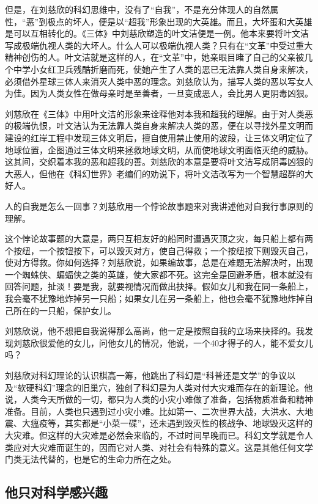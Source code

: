 \documentclass[fontset=fandol,12pt,a5paper]{ctexbook}
\begin{document}
但是，在刘慈欣的科幻思维中，没有了“自我”，不是充分体现人的自然属性，“恶”到极点的坏人，便是以“超我”形象出现的大英雄。而且，大坏蛋和大英雄是可以互相转化的。《三体》中刘慈欣塑造的叶文洁便是一例。他本来要将叶文洁写成极端仇视人类的大坏人。什么人可以极端仇视人类？只有在“文革”中受过重大精神创伤的人。叶文洁就是这样的人，在“文革”中，她亲眼目睹了自己的父亲被几个中学小女红卫兵残酷折磨而死，使她产生了人类的恶已无法靠人类自身来解决，必须借外星球三体人来消灭人类中恶的理念。刘慈欣认为，描写人类的恶以写女人为佳。因为人类女性在做母亲时是至善者，一旦变成恶人，会比男人更阴毒凶狠。

刘慈欣在《三体》中用叶文洁的形象来诠释他对本我和超我的理解。由于对人类恶的极端仇恨，叶文洁认为无法靠人类自身来解决人类的恶，便在以寻找外星文明而建设的红岸工程中发现三体文明后，擅自使用禁止使用的波段，让三体文明定位了地球位置，企图通过三体文明来拯救地球文明，从而使地球文明面临灭绝的威胁。这其间，交织着本我的恶和超我的善。刘慈欣的本意是要将叶文洁写成阴毒凶狠的大恶人，但他在《科幻世界》老编们的劝说下，将叶文洁改写为一个智慧超群的大好人。

人的自我是怎么一回事？刘慈欣用一个悖论故事题来对我讲述他对自我行事原则的理解。

这个悖论故事题的大意是，两只互相友好的船同时遭遇灭顶之灾，每只船上都有两个按纽，一个按钮按下，可以毁灭对方，使自己得救；一个按纽按下则毁灭自己，使对方得救。你如何选择？刘慈欣说，如果编故事，总是在难题无法解决时，出现一个蜘蛛侠、蝙蝠侠之类的英雄，使大家都不死。这完全是回避矛盾，根本就没有回答问题，扯淡！要是我，就要视情况而做出抉择。假如女儿和我在同一条船上，我会毫不犹豫地炸掉另一只船；如果女儿在另一条船上，他也会毫不犹豫地炸掉自己所在的一只船，保护女儿。

刘慈欣说，他不想把自我说得那么高尚，他一定是按照自我的立场来抉择的。我发现刘慈欣很爱他的女儿，问他女儿的情况，他说，一个40才得子的人，能不爱女儿吗？

刘慈欣对科幻理论的认识棋高一筹，他跳出了科幻是“科普还是文学”的争议以及“软硬科幻”理念的旧巢穴，独创了科幻是为人类对付大灾难而存在的新理论。他说，人类今天所做的一切，都只为人类的小灾小难做了准备，包括物质准备和精神准备。目前，人类也只遇到过小灾小难。比如第一、二次世界大战，大洪水、大地震、大瘟疫等，其实都是“小菜一碟”，还未遇到毁灭性的核战争、地球毁灭这样的大灾难。但这样的大灾难是必然会来临的，不过时间早晚而已。科幻文学就是令人类应对大灾难而诞生的，因而它对人类、对社会有特殊的意义。这是其他任何文学门类无法代替的，也是它的生命力所在之处。

\subsection{他只对科学感兴趣}
\end{document}
